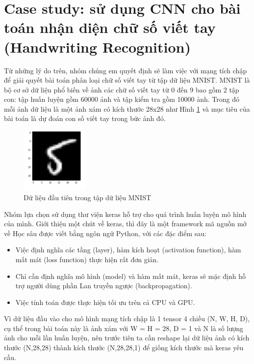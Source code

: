 \documentclass[a4paper]{article}
\begin{document}
\section{Case study: sử dụng CNN cho bài toán nhận diện chữ số viết tay (Handwriting Recognition)}

Từ những lý do trên, nhóm chúng em quyết định sẽ làm việc với mạng tích chập để giải quyết bài toán phân loại chữ số viết tay từ tập dữ liệu MNIST. MNIST là bộ cơ sở dữ liệu phổ biến về ảnh các chữ số viết tay từ 0 đến 9 bao gồm 2 tập con: tập huấn luyện gồm 60000 ảnh và tập kiểm tra gồm 10000 ảnh. Trong đó mỗi ảnh dữ liệu là một ảnh xám có kích thước 28x28 như Hình \ref{fig:data MNIST} và mục tiêu của bài toán là dự đoán con số viết tay trong bức ảnh đó.

\begin{figure}[h]
    \centering
    \includegraphics[width=0.3\textwidth]{image/data MNIST.png}
    \caption{Dữ liệu đầu tiên trong tập dữ liệu MNIST}
    \label{fig:data MNIST}
\end{figure}

Nhóm lựa chọn sử dụng thư viện keras hỗ trợ cho quá trình huấn luyện mô hình của mình. Giới thiệu một chút về keras, thì đây là một framework mã nguồn mở về Học sâu được viết bằng ngôn ngữ Python, với các đặc điểm sau:

\begin{itemize}
    \item Việc định nghĩa các tầng (layer), hàm kích hoạt (activation function), hàm mất mát (loss function) thực hiện rất đơn giản.
    \item Chỉ cần định nghĩa mô hình (model) và hàm mất mát, keras sẽ mặc định hỗ trợ người dùng phần Lan truyền ngược (backpropagation).
    \item Việc tính toán được thực hiện tối ưu trên cả CPU và GPU.
\end{itemize}

Vì dữ liệu đầu vào cho mô hình mạng tích chập là 1 tensor 4 chiều (N, W, H, D), cụ thể trong bài toán này là ảnh xám với W = H = 28, D = 1 và N là số lượng ảnh cho mỗi lần huấn luyện, nên trước tiên ta cần reshape lại dữ liệu ảnh có kích thước (N,28,28) thành kích thước (N,28,28,1) để giống kích thước mà keras yêu cầu.
\end{document}
